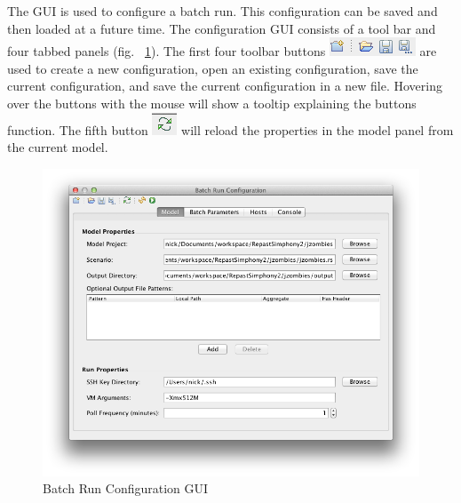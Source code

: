 \documentclass[11pt]{amsart}
\begin{document}
The GUI is used to configure a batch run. This configuration can be saved and then loaded at a future time. The configuration GUI consists of a tool bar and four tabbed panels (fig. ~\ref{fig:config_gui}). The first four toolbar buttons \includegraphics[height=.2in]{images/gui_file_buttons.png} are used to create a new configuration, open an existing configuration, save the current configuration, and save the current configuration in a new file. Hovering over the buttons with the mouse will show a tooltip explaining the buttons function.  The fifth button \includegraphics[height=.2in]{images/reload_button.png} will reload the properties in the model panel from the current model. 

\begin{figure}[h]
\begin{center}
\vspace{.2in}
\centerline {
\includegraphics[width=6.5in]{images/config_gui.png}
}
\caption{Batch Run Configuration GUI}
\label{fig:config_gui}
\end{center}
\end{figure}
\end{document}
